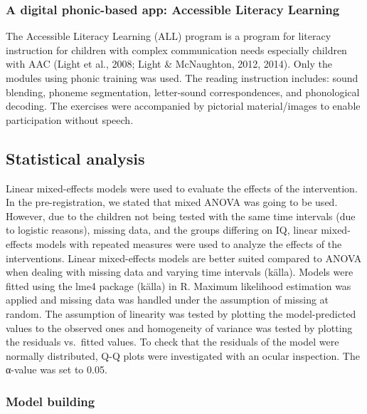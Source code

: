 \documentclass[
  ,
]{article}
\begin{document}
\hypertarget{a-digital-phonic-based-app-accessible-literacy-learning}{%
\subsubsection{A digital phonic-based app: Accessible Literacy
Learning}\label{a-digital-phonic-based-app-accessible-literacy-learning}}

The Accessible Literacy Learning (ALL) program is a program for literacy
instruction for children with complex communication needs especially
children with AAC (Light et al., 2008; Light \& McNaughton, 2012, 2014).
Only the modules using phonic training was used. The reading instruction
includes: sound blending, phoneme segmentation, letter-sound
correspondences, and phonological decoding. The exercises were
accompanied by pictorial material/images to enable participation without
speech.

\hypertarget{statistical-analysis}{%
\subsection{Statistical analysis}\label{statistical-analysis}}

Linear mixed-effects models were used to evaluate the effects of the
intervention. In the pre-registration, we stated that mixed ANOVA was
going to be used. However, due to the children not being tested with the
same time intervals (due to logistic reasons), missing data, and the
groups differing on IQ, linear mixed-effects models with repeated
measures were used to analyze the effects of the interventions. Linear
mixed-effects models are better suited compared to ANOVA when dealing
with missing data and varying time intervals (källa). Models were fitted
using the lme4 package (källa) in R. Maximum likelihood estimation was
applied and missing data was handled under the assumption of missing at
random. The assumption of linearity was tested by plotting the
model-predicted values to the observed ones and homogeneity of variance
was tested by plotting the residuals vs.~fitted values. To check that
the residuals of the model were normally distributed, Q-Q plots were
investigated with an ocular inspection. The α-value was set to 0.05.

\hypertarget{model-building}{%
\subsubsection{Model building}\label{model-building}}
\end{document}
